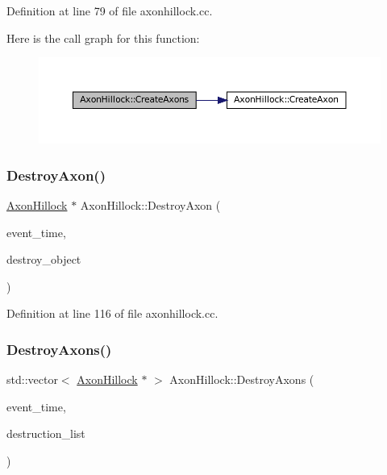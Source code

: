 Definition at line 79 of file axonhillock.\+cc.

Here is the call graph for this function\+:\nopagebreak
\begin{figure}[H]
\begin{center}
\leavevmode
\includegraphics[width=350pt]{class_axon_hillock_a15bf1a433f38b8b0c92e4a4efe22ec6f_cgraph}
\end{center}
\end{figure}
\mbox{\label{class_axon_hillock_a031b2cc7292d023506a5124639a941a7}} 
\subsubsection{\texorpdfstring{Destroy\+Axon()}{DestroyAxon()}}
{\footnotesize\ttfamily \mbox{\hyperlink{class_axon_hillock}{Axon\+Hillock}} $\ast$ Axon\+Hillock\+::\+Destroy\+Axon (\begin{DoxyParamCaption}\item[{std\+::chrono\+::time\+\_\+point$<$ \mbox{\hyperlink{universe_8h_a0ef8d951d1ca5ab3cfaf7ab4c7a6fd80}{Clock}} $>$}]{event\+\_\+time,  }\item[{\mbox{\hyperlink{class_axon_hillock}{Axon\+Hillock}} $\ast$}]{destroy\+\_\+object }\end{DoxyParamCaption})}



Definition at line 116 of file axonhillock.\+cc.

\mbox{\label{class_axon_hillock_a083c918c64c60f3cea1d39aa8e0c6fba}} 
\subsubsection{\texorpdfstring{Destroy\+Axons()}{DestroyAxons()}}
{\footnotesize\ttfamily std\+::vector$<$ \mbox{\hyperlink{class_axon_hillock}{Axon\+Hillock}} $\ast$ $>$ Axon\+Hillock\+::\+Destroy\+Axons (\begin{DoxyParamCaption}\item[{std\+::chrono\+::time\+\_\+point$<$ \mbox{\hyperlink{universe_8h_a0ef8d951d1ca5ab3cfaf7ab4c7a6fd80}{Clock}} $>$}]{event\+\_\+time,  }\item[{std\+::vector$<$ \mbox{\hyperlink{class_axon_hillock}{Axon\+Hillock}} $\ast$$>$}]{destruction\+\_\+list }\end{DoxyParamCaption})}



